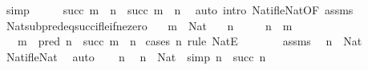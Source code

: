 \begin{isabellebody}
\ simp\isanewline
\ \ \isamarkupfalse%
\ \isamarkupfalse%
\ {\isachardoublequoteopen}succ\ m\ {\isacharminus}{\kern0pt}\ n\ {\isacharequal}{\kern0pt}\ succ\ {\isacharparenleft}{\kern0pt}m\ {\isacharminus}{\kern0pt}\ n{\isacharparenright}{\kern0pt}{\isachardoublequoteclose}\ \isacommand{{\isachardot}{\kern0pt}}\isamarkupfalse%
\isanewline
{}\isamarkupfalse%
\ {\isacharparenleft}{\kern0pt}auto\ intro{\isacharcolon}{\kern0pt}\ Nat{\isacharunderscore}{\kern0pt}if{\isacharunderscore}{\kern0pt}le{\isacharunderscore}{\kern0pt}Nat{\isacharbrackleft}{\kern0pt}OF\ assms{\isacharbrackright}{\kern0pt}{\isacharparenright}{\kern0pt}%
\endisatagproof
{\isafoldproof}%
%
\isadelimproof
\isanewline
%
\endisadelimproof
\isanewline
{}\isamarkupfalse%
\ Nat{\isacharunderscore}{\kern0pt}sub{\isacharunderscore}{\kern0pt}pred{\isacharunderscore}{\kern0pt}eq{\isacharunderscore}{\kern0pt}succ{\isacharunderscore}{\kern0pt}if{\isacharunderscore}{\kern0pt}le{\isacharunderscore}{\kern0pt}if{\isacharunderscore}{\kern0pt}ne{\isacharunderscore}{\kern0pt}zero{\isacharcolon}{\kern0pt}\isanewline
\ \ \ {\isachardoublequoteopen}m\ {\isacharcolon}{\kern0pt}\ Nat{\isachardoublequoteclose}\isanewline
\ \ \ {\isachardoublequoteopen}n\ {\isasymnoteq}\ {}{\isachardoublequoteclose}\isanewline
\ \ \ {\isachardoublequoteopen}n\ {\isasymle}\ m{\isachardoublequoteclose}\isanewline
\ \ \ {\isachardoublequoteopen}m\ {\isacharminus}{\kern0pt}\ pred\ n\ {\isacharequal}{\kern0pt}\ succ\ {\isacharparenleft}{\kern0pt}m\ {\isacharminus}{\kern0pt}\ n{\isacharparenright}{\kern0pt}{\isachardoublequoteclose}\isanewline
%
\isadelimproof
%
\endisadelimproof
%
\isatagproof
{}\isamarkupfalse%
\ {\isacharparenleft}{\kern0pt}cases\ n\ rule{\isacharcolon}{\kern0pt}\ NatE{\isacharparenright}{\kern0pt}\isanewline
\ \ \ \isanewline
\ \ \isamarkupfalse%
\ assms\ \isamarkupfalse%
\ {\isachardoublequoteopen}n\ {\isacharcolon}{\kern0pt}\ Nat{\isachardoublequoteclose}\ \isamarkupfalse%
\ Nat{\isacharunderscore}{\kern0pt}if{\isacharunderscore}{\kern0pt}le{\isacharunderscore}{\kern0pt}Nat\ \isamarkupfalse%
\ auto\isanewline
\ \ \isamarkupfalse%
\ n{\isacharprime}{\kern0pt}\ \isamarkupfalse%
\ {\isachardoublequoteopen}n{\isacharprime}{\kern0pt}\ {\isacharcolon}{\kern0pt}\ Nat{\isachardoublequoteclose}\ \ {\isacharbrackleft}{\kern0pt}simp{\isacharbrackright}{\kern0pt}{\isacharcolon}{\kern0pt}\ {\isachardoublequoteopen}n\ {\isacharequal}{\kern0pt}\ succ\ n{\isacharprime}{\kern0pt}{\isachardoublequoteclose}\isanewline

\end{isabellebody}
